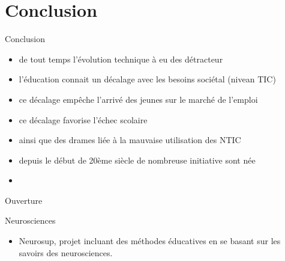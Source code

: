 \section{Conclusion}

\begin{frame}{Conclusion}
  \begin{itemize}
    \item de tout temps l'évolution technique à eu des détracteur
    \item l'éducation connait un décalage avec les besoins sociétal (nivean TIC)
    \item ce décalage empêche l'arrivé des jeunes sur le marché de l'emploi
    \item ce décalage favorise l'échec scolaire
    \item ainsi que des drames liée à la mauvaise utilisation des NTIC
    \item depuis le début de 20ème siècle de nombreuse initiative sont née
    \item 
  \end{itemize}
\end{frame}

\begin{frame}{Ouverture}
  \begin{block}{Neurosciences}
    \begin{itemize}
      \item Neurosup, projet incluant des méthodes éducatives en se basant sur les savoirs des neurosciences.
    \end{itemize}
  \end{block}
\end{frame}

